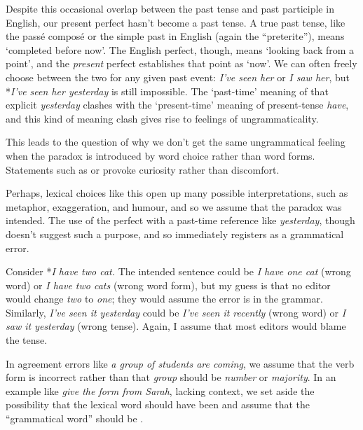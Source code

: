 Despite this occasional overlap between the past tense and past participle in English, our present perfect hasn't become a past tense. A true past tense, like the passé composé or the simple past in English (again the \enquote{preterite}), means `completed before now'. The English perfect, though, means `looking back from a point', and the \textit{present} perfect establishes that point as `now'. We can often freely choose between the two for any given past event: \textit{I've seen her} or \textit{I saw her}, but *\textit{I've seen her yesterday} is still impossible. The `past-time' meaning of that explicit \textit{yesterday} clashes with the `present-time' meaning of present-tense \textit{have}, and this kind of meaning clash gives rise to feelings of ungrammaticality.

This leads to the question of why we don't get the same ungrammatical feeling when the paradox is introduced by word choice rather than word forms. Statements such as  or  provoke curiosity rather than discomfort.

Perhaps, lexical choices like this open up many possible interpretations, such as metaphor, exaggeration, and humour, and so we assume that the paradox was intended. The use of the perfect with a past-time reference like \textit{yesterday}, though doesn't suggest such a purpose, and so immediately registers as a grammatical error.

Consider *\textit{I have two cat.} The intended sentence could be \textit{I have one cat} (wrong word) or \textit{I have two cats} (wrong word form), but my guess is that no editor would change \textit{two} to \textit{one}; they would assume the error is in the grammar. Similarly, \textit{I've seen it yesterday} could be \textit{I've seen it recently} (wrong word) or \textit{I saw it yesterday} (wrong tense). Again, I assume that most editors would blame the tense.

In agreement errors like \textit{a group of students are coming}, we assume that the verb form is incorrect rather than that \textit{group} should be \textit{number} or \textit{majority}. In an example like \textit{give the form from Sarah}, lacking context, we set aside the possibility that the lexical word  should have been  and assume that the \enquote{grammatical word}  should be .

